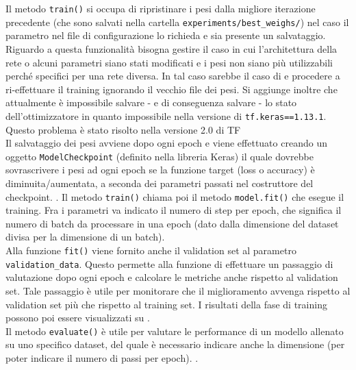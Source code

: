 Il metodo \texttt{train()} si occupa di ripristinare i pesi dalla migliore iterazione precedente (che sono salvati nella cartella \texttt{experiments/best\_weighs/}) nel caso il parametro nel file di configurazione lo richieda e sia presente un salvataggio. Riguardo a questa funzionalità bisogna gestire il caso in cui l'architettura della rete o alcuni parametri siano stati modificati e i pesi non siano più utilizzabili perché specifici per una rete diversa. In tal caso sarebbe il caso di  e procedere a ri-effettuare il training ignorando il vecchio file dei pesi. Si aggiunge inoltre che attualmente è impossibile salvare - e di conseguenza salvare - lo stato dell'ottimizzatore in quanto impossibile nella versione di \texttt{tf.keras==1.13.1}. Questo problema è stato risolto nella versione 2.0 di TF\\
Il salvataggio dei pesi avviene dopo ogni epoch e viene effettuato creando un oggetto \texttt{Model\-Checkpoint} (definito nella libreria Keras) il quale dovrebbe sovrascrivere i pesi ad ogni epoch se la funzione target (loss o accuracy) è diminuita/aumentata, a seconda dei parametri passati nel costruttore del checkpoint. . Il metodo \texttt{train()} chiama poi il metodo \texttt{model.fit()} che esegue il training. Fra i parametri va indicato il numero di step per epoch, che significa il numero di batch da processare in una epoch (dato dalla dimensione del dataset divisa per la dimensione di un batch).\\
Alla funzione \texttt{fit()} viene fornito anche il validation set al parametro \texttt{validation\_data}. Questo permette alla funzione di effettuare un passaggio di valutazione dopo ogni epoch e calcolare le metriche anche rispetto al validation set. Tale passaggio è utile per monitorare che il miglioramento avvenga rispetto al validation set più che rispetto al training set.
I risultati della fase di training possono poi essere visualizzati su .\\

Il metodo \texttt{evaluate()} è utile per valutare le performance di un modello allenato su uno specifico dataset, del quale è necessario indicare anche la dimensione (per poter indicare il numero di passi per epoch). .\\

